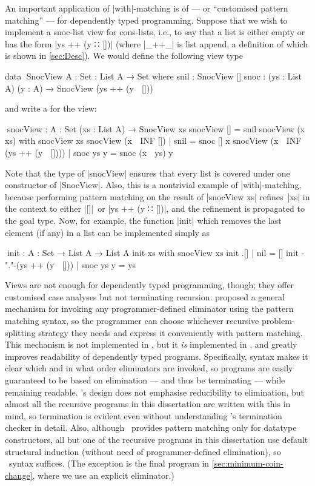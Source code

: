 An important application of |with|-matching is  of  --- or ``customised pattern matching'' --- for dependently typed programming.
Suppose that we wish to implement a snoc-list view for cons-lists, i.e., to say that a list is either empty or has the form |ys ++ (y ∷ [])| (where |_++_| is list append, a definition of which is shown in \autoref{sec:Desc}).
We would define the following view type
\begin{code}
data ^^^SnocView {A : Set} : List A → Set where
  snil  : SnocView []
  snoc  : (ys : List A) (y : A) → SnocView (ys ++ (y ∷ []))
\end{code}
and write a  for the view:
\begin{code}
^^^snocView : {A : Set} (xs : List A) → SnocView xs
snocView [] = snil
snocView (x ∷ xs)                    with snocView xs
snocView (x ∷ INF [])                | snil       = snoc [] x
snocView (x ∷ INF (ys ++ (y ∷ [])))  | snoc ys y  = snoc (x ∷ ys) y
\end{code}
Note that the type of |snocView| ensures that every list is covered under one constructor of |SnocView|.
Also, this is a nontrivial example of |with|-matching, because performing pattern matching on the result of |snocView xs| refines~|xs| in the context to either |[]|~or |ys ++ (y ∷ [])|, and the refinement is propagated to the goal type.
Now, for example, the function |init| which removes the last element (if any) in a list can be implemented simply as
\begin{code}
^^^init : {A : Set} → List A → List A
init xs                       with snocView xs
init .[]                      | nil        = []
init {-"."-}(ys ++ (y ∷ []))  | snoc ys y  = ys
\end{code}

Views are not enough for dependently typed programming, though; they offer customised case analyses but not terminating recursion.
\citet{McBride-view} proposed a general mechanism for invoking any programmer-defined eliminator using the pattern matching syntax, so the programmer can choose whichever recursive problem-splitting strategy they needs and express it conveniently with pattern matching.
This mechanism is not implemented in \Agda, but it \emph{is} implemented in , and greatly improves readability of dependently typed programs.
Specifically,  syntax makes it clear which and in what order eliminators are invoked, so programs are easily guaranteed to be based on elimination --- and thus be terminating --- while remaining readable.
\Agda's design does not emphasise reducibility to elimination, but almost all the recursive programs in this dissertation are written with this in mind, so termination is evident even without understanding \Agda's termination checker in detail.
Also, although \Agda\ provides pattern matching only for datatype constructors, all but one of the recursive programs in this dissertation use default structural induction (without need of programmer-defined elimination), so \Agda\ syntax suffices.
(The exception is the final program in \autoref{sec:minimum-coin-change}, where we use an explicit eliminator.)


